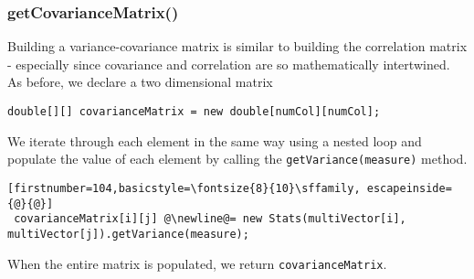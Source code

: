 \documentclass[../Dissertation.tex]{subfiles}
\begin{document}
\subsubsection{getCovarianceMatrix()}

Building a variance-covariance matrix is similar to building the correlation matrix - especially since covariance and correlation are so mathematically intertwined.
As before, we declare a two dimensional matrix
\begin{lstlisting}[firstnumber = 101]
 	double[][] covarianceMatrix = new double[numCol][numCol];
\end{lstlisting}
We iterate through each element in the same way using a nested loop and populate the value of each element by calling the \lstinline|getVariance(measure)| method.
\begin{lstlisting}[firstnumber=104,basicstyle=\fontsize{8}{10}\sffamily, escapeinside={@}{@}]
 covarianceMatrix[i][j] @\newline@= new Stats(multiVector[i], multiVector[j]).getVariance(measure);
 \end{lstlisting}
When the entire matrix is populated, we return \lstinline|covarianceMatrix|.
\end{document}
